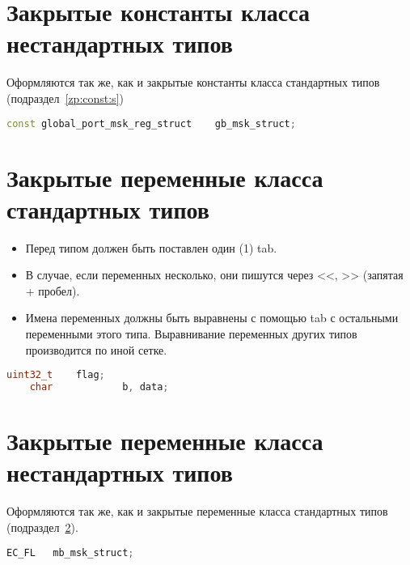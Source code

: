 \section{Закрытые константы класса нестандартных типов}\label{zp:const:n}
Оформляются так же, как и закрытые константы класса стандартных типов (подраздел~\ref{zp:const:s})\begin{lstlisting}[language=C++, frame=tlBR, basicstyle=\fontsize{10}{10}\ttfamily]
	const global_port_msk_reg_struct	gb_msk_struct;
\end{lstlisting}

\section{Закрытые переменные класса стандартных типов}\label{zp:pp:s}
\begin{itemize}
	\item Перед типом должен быть поставлен один (1) tab.
	\item В случае, если переменных несколько, они пишутся через <<, >> (запятая + пробел).
	\item Имена переменных должны быть выравнены с помощью tab с остальными переменными этого типа. Выравнивание переменных других типов производится по иной сетке.
\end{itemize}\begin{lstlisting}[language=C++, frame=tlBR, basicstyle=\fontsize{10}{10}\ttfamily]
	uint32_t	flag;
	char			b, data;
\end{lstlisting}

\section{Закрытые переменные класса нестандартных типов}\label{zp:pp:n}
Оформляются так же, как и закрытые переменные класса стандартных типов (подраздел~\ref{zp:pp:s}).\begin{lstlisting}[language=C++, frame=tlBR, basicstyle=\fontsize{10}{10}\ttfamily]
	EC_FL	mb_msk_struct;
\end{lstlisting}